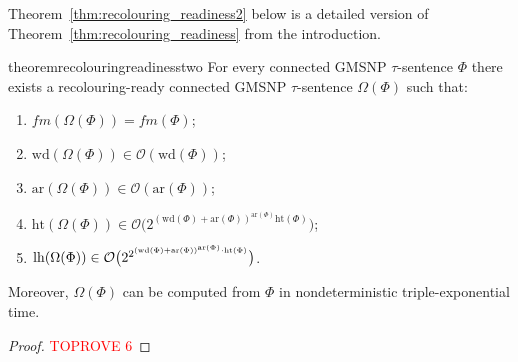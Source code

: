 \documentclass[oneside,reqno,12pt]{amsart}
\theoremstyle{plain}
\theoremstyle{remark}
\newcommand{\fm}{\ensuremath{\mathit{fm}}\xspace}
\newcommand{\hh}{\ensuremath{\mathrm{ht}}\xspace}
\newcommand{\lh}{\ensuremath{\mathrm{lh}}\xspace}
\newcommand{\wh}{\ensuremath{\mathrm{wd}}\xspace}
\newcommand{\ar}{\ensuremath{\mathrm{ar}}\xspace}
\begin{document}
{Theorem~\ref{thm:recolouring_readiness2} below is a detailed version of Theorem~\ref{thm:recolouring_readiness} from the introduction.
\begin{restatable}{theorem}{recolouringreadinesstwo}    \label{thm:recolouring_readiness2}   
   For every connected GMSNP $\tau$-sentence $\Phi$ there exists  a  recolouring-ready connected 
 GMSNP $\tau$-sentence $\Omega(\Phi)$ such that: 
\begin{enumerate} 
 \item \label{item:ready1} $\fm(\Omega(\Phi))=\fm(\Phi)$;
 \item \label{item:ready2} $\wh(\Omega(\Phi))\in\mathcal{O}(\wh(\Phi))$;
 \item \label{item:ready3} $\ar(\Omega(\Phi))\in\mathcal{O}(\ar(\Phi))$;
 \item \label{item:ready4} $\hh(\Omega(\Phi))\in\mathcal{O}\bigl(2^{(\wh(\Phi)+\ar(\Phi))^{\ar(\Phi)}\hh(\Phi)}\bigr)$;
 \item \label{item:ready5} $\lh(\Omega(\Phi))\in\mathcal{O}\bigl(2^{2^{(\wh(\Phi)+\ar(\Phi))\smash{^{\ar(\Phi)}}\cdot\hh(\Phi)}}\bigr)$.
\end{enumerate}   
 Moreover, $\Omega(\Phi)$ can be computed from $\Phi$ in nondeterministic triple-exponential time.

\end{restatable}  

\begin{proof}\textcolor{red}{TOPROVE 6}\end{proof} 

}
\end{document}
